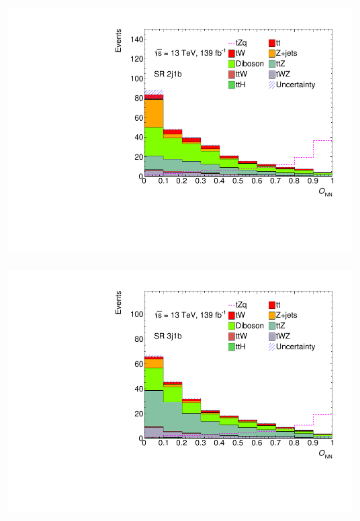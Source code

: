 \begin{figure}[ht] 
  \begin{subfigure}[b]{0.5\linewidth}
    \centering
    \includegraphics[width=\linewidth]{ubonn-thesis/Chapters/Chapters_06/Figure/Neural Network/SR_2j1b.pdf} 
    \vspace*{-0.9cm}
    \caption{} 
    \label{predict:SR2j1b} 
  \end{subfigure}%
  \begin{subfigure}[b]{0.5\linewidth}
    \centering
    \includegraphics[width=\linewidth]{ubonn-thesis/Chapters/Chapters_06/Figure/Neural Network/SR_3j1b.pdf} 
     \vspace*{-0.9cm}
    \caption{} 
    \label{predict:SR3j1b} 
  \end{subfigure} 
  \begin{subfigure}[b]{0.5\linewidth}

\end{subfigure}
\end{figure}
